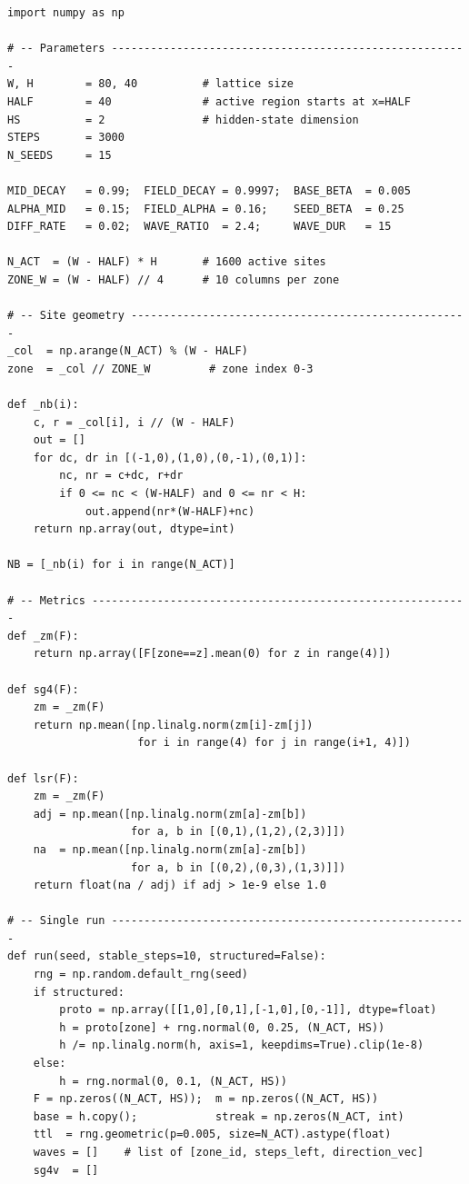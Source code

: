 \documentclass[11pt,twocolumn]{article}
\begin{document}
\begin{lstlisting}[caption={vcsm\_paper0\_repro.py}]
import numpy as np

# -- Parameters -------------------------------------------------------
W, H        = 80, 40          # lattice size
HALF        = 40              # active region starts at x=HALF
HS          = 2               # hidden-state dimension
STEPS       = 3000
N_SEEDS     = 15

MID_DECAY   = 0.99;  FIELD_DECAY = 0.9997;  BASE_BETA  = 0.005
ALPHA_MID   = 0.15;  FIELD_ALPHA = 0.16;    SEED_BETA  = 0.25
DIFF_RATE   = 0.02;  WAVE_RATIO  = 2.4;     WAVE_DUR   = 15

N_ACT  = (W - HALF) * H       # 1600 active sites
ZONE_W = (W - HALF) // 4      # 10 columns per zone

# -- Site geometry ----------------------------------------------------
_col  = np.arange(N_ACT) % (W - HALF)
zone  = _col // ZONE_W         # zone index 0-3

def _nb(i):
    c, r = _col[i], i // (W - HALF)
    out = []
    for dc, dr in [(-1,0),(1,0),(0,-1),(0,1)]:
        nc, nr = c+dc, r+dr
        if 0 <= nc < (W-HALF) and 0 <= nr < H:
            out.append(nr*(W-HALF)+nc)
    return np.array(out, dtype=int)

NB = [_nb(i) for i in range(N_ACT)]

# -- Metrics ----------------------------------------------------------
def _zm(F):
    return np.array([F[zone==z].mean(0) for z in range(4)])

def sg4(F):
    zm = _zm(F)
    return np.mean([np.linalg.norm(zm[i]-zm[j])
                    for i in range(4) for j in range(i+1, 4)])

def lsr(F):
    zm = _zm(F)
    adj = np.mean([np.linalg.norm(zm[a]-zm[b])
                   for a, b in [(0,1),(1,2),(2,3)]])
    na  = np.mean([np.linalg.norm(zm[a]-zm[b])
                   for a, b in [(0,2),(0,3),(1,3)]])
    return float(na / adj) if adj > 1e-9 else 1.0

# -- Single run -------------------------------------------------------
def run(seed, stable_steps=10, structured=False):
    rng = np.random.default_rng(seed)
    if structured:
        proto = np.array([[1,0],[0,1],[-1,0],[0,-1]], dtype=float)
        h = proto[zone] + rng.normal(0, 0.25, (N_ACT, HS))
        h /= np.linalg.norm(h, axis=1, keepdims=True).clip(1e-8)
    else:
        h = rng.normal(0, 0.1, (N_ACT, HS))
    F = np.zeros((N_ACT, HS));  m = np.zeros((N_ACT, HS))
    base = h.copy();            streak = np.zeros(N_ACT, int)
    ttl  = rng.geometric(p=0.005, size=N_ACT).astype(float)
    waves = []    # list of [zone_id, steps_left, direction_vec]
    sg4v  = []


\end{lstlisting}
\end{document}
